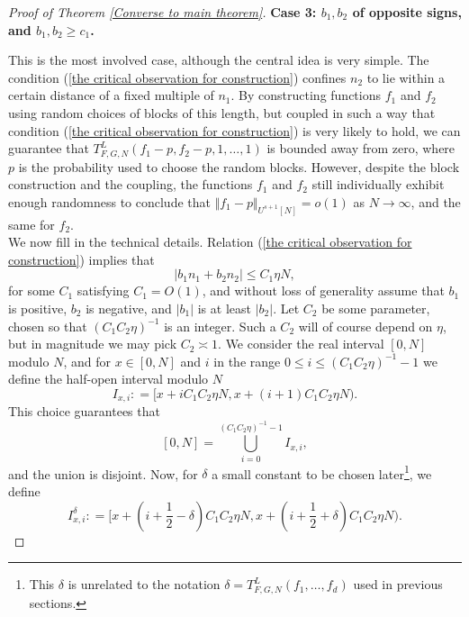 \documentclass[12pt,a4paper,twoside,reqno]{amsart}
\numberwithin{equation}{section}
\begin{document}
\begin{proof}[Proof of Theorem \ref{Converse to main theorem}]
\noindent \textbf{Case 3: $b_1,b_2$ of opposite signs, and $b_1,b_2\geqslant c_1$.}

This is the most involved case, although the central idea is very simple. The condition (\ref{the critical observation for construction}) confines $n_2$ to lie within a certain distance of a fixed multiple of $n_1$. By constructing functions $f_1$ and $f_2$ using random choices of blocks of this length, but coupled in such a way that condition (\ref{the critical observation for construction}) is very likely to hold, we can guarantee that $T_{F,G,N}^L(f_1-p,f_2-p,1,\dots,1)$ is bounded away from zero, where $p$ is the probability used to choose the random blocks. However, despite the block construction and the coupling, the functions $f_1$ and $f_2$ still individually exhibit enough randomness to conclude that $\Vert f_1 - p\Vert _{U^{s+1}[N]} = o(1)$ as $N\rightarrow \infty$, and the same for $f_2$.  \\

We now fill in the technical details. Relation (\ref{the critical observation for construction}) implies that 
\begin{equation}
\label{the critical equation for construction with an explicit constant}
 \vert b_1n_1 + b_2n_2\vert \leqslant C_1\eta N,
\end{equation}
\noindent for some $C_1$ satisfying $C_1 = O(1)$, and without loss of generality assume that $b_1$ is positive, $b_2$ is negative, and $\vert b_1\vert$ is at least $\vert b_2\vert$. Let $C_2$ be some parameter, chosen so that $(C_1C_2\eta)^{-1}$ is an integer. Such a $C_2$ will of course depend on $\eta$, but in magnitude we may pick $C_2\asymp 1$. We consider the real interval $[0,N]$ modulo $N$, and for $x\in [0,N]$ and $i$ in the range $0\leqslant i\leqslant (C_1C_2\eta)^{-1} - 1$ we define the half-open interval modulo $N$ $$I_{x,i}: = [x+ i C_1C_2\eta N,x+(i+1)C_1C_2\eta N).$$  This choice guarantees that 
\begin{equation}
\label{the defining partition}
[0,N] = \bigcup\limits_{i=0}^{(C_1C_2\eta)^{-1} - 1} I_{x,i},
\end{equation}
 and the union is disjoint. Now, for $\delta$ a small constant to be chosen later\footnote{This $\delta$ is unrelated to the notation $\delta = T_{F,G,N}^L(f_1,\dots,f_d)$ used in previous sections.}, we define $$I^\delta_{x,i}: = [x+ (i+\frac{1}{2}-\delta) C_1C_2\eta N,x+(i+\frac{1}{2}+\delta)C_1C_2\eta N).$$ 
 

\end{proof}
\end{document}
